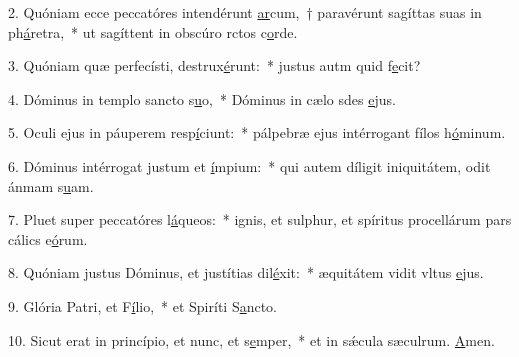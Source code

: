 2. Quóniam ecce peccatóres intendérunt \uline{ar}cum,~† paravérunt sagíttas suas in ph\uline{á}retra,~* ut sagíttent in obscúro rctos c\uline{o}rde.\par 
3. Quóniam quæ perfecísti, destrux\uline{é}runt:~* justus autm quid f\uline{e}cit?\par 
4. Dóminus in templo sancto s\uline{u}o,~* Dóminus in cælo sdes \uline{e}jus.\par 
5. Oculi ejus in páuperem resp\uline{í}ciunt:~* pálpebræ ejus intérrogant fílos h\uline{ó}minum.\par 
6. Dóminus intérrogat justum et \uline{í}mpium:~* qui autem díligit iniquitátem, odit ánmam s\uline{u}am.\par 
7. Pluet super peccatóres l\uline{á}queos:~* ignis, et sulphur, et spíritus procellárum pars cálics e\uline{ó}rum.\par 
8. Quóniam justus Dóminus, et justítias dil\uline{é}xit:~* æquitátem vidit vltus \uline{e}jus.\par 
9. Glória Patri, et F\uline{í}lio,~* et Spiríti S\uline{a}ncto.\par 
10. Sicut erat in princípio, et nunc, et s\uline{e}mper,~* et in sǽcula sæculrum. \uline{A}men.\par 
